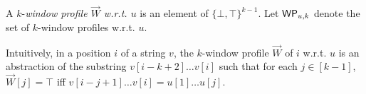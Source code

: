 %
%
%


\begin{definition}
A $k$-\emph{window profile $\overrightarrow{W}$ w.r.t. $u$} is an element of $\{\bot,\top\}^{k-1}$. Let $\mathsf{WP}_{u, k}$ denote the set of $k$-window profiles w.r.t. $u$. 
\end{definition}

Intuitively, in a position $i$ of a string $v$, the $k$-window profile $\overrightarrow{W}$ of $i$ w.r.t. $u$ is an abstraction of the substring $v[i-k+2] \dots v[i]$ such that for each $j \in [k-1]$, $\overrightarrow{W}[j] = \top$ iff $v[i-j+1] \dots v[i] = u[1] \dots u[j]$. 

